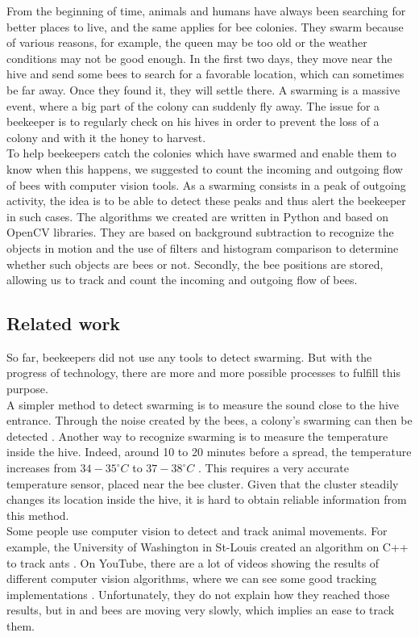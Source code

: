 \documentclass[10pt,twocolumn,letterpaper]{article}
\begin{document}
From the beginning of time, animals and humans have always been searching for better places to live, and the same applies for bee colonies. They swarm because of various reasons, for example, the queen may be too old or the weather conditions may not be good enough. In the first two days, they move near the hive and send some bees to search for a favorable location, which can sometimes be far away. Once they found it, they will settle there. A swarming is a massive event, where a big part of the colony can suddenly fly away. The issue for a beekeeper is to regularly check on his hives in order to prevent the loss of a colony and with it the honey to harvest. \\
To help beekeepers catch the colonies which have swarmed and enable them to know when this happens, we suggested to count the incoming and outgoing flow of bees with computer vision tools. As a swarming consists in a peak of outgoing activity, the idea is to be able to detect these peaks and thus alert the beekeeper in such cases. The algorithms we created are written in Python and based on OpenCV libraries. They are based on background subtraction to recognize the objects in motion and the use of filters and histogram comparison to determine whether such objects are bees or not. Secondly, the bee positions are stored, allowing us to track and count the incoming and outgoing flow of bees. 


\subsection{Related work}

So far, beekeepers did not use any tools to detect swarming. But with the progress of technology, there are more and more possible processes to fulfill this purpose.\\
A simpler method to detect swarming is to measure the sound close to the hive entrance. Through the noise created by the bees, a colony's swarming can then be detected \cite{Authors_Papper_1}. Another way to recognize swarming is to measure the temperature inside the hive. Indeed, around 10 to 20 minutes before a spread, the temperature increases from $34-35^\circ C$ to $37-38^\circ C$ \cite{Authors_Papper_2}. This requires a very accurate temperature sensor, placed near the bee cluster. Given that the cluster steadily changes its location inside the hive, it is hard to obtain reliable information from this method.\\
Some people use computer vision to detect and track animal movements. For example, the University of Washington in St-Louis created an algorithm on C++ to track ants \cite{Authors_BioTracking}. On YouTube, there are a lot of videos showing the results of different computer vision algorithms, where we can see some good tracking implementations \cite{Authors_Youtube_1} \cite{Authors_Youtube_2}  \cite{Authors_Youtube_3}. Unfortunately, they do not explain how they reached those results, but in \cite{Authors_Youtube_1} and \cite{Authors_Youtube_2} bees are moving very slowly, which implies an ease to track them.
\end{document}
